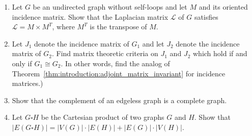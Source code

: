 \begin{enumerate}
\item Let $G$ be an undirected graph without self-loops and let $M$
  and its oriented incidence matrix. Show that the Laplacian matrix
  $\mathcal{L}$ of $G$ satisfies $\mathcal{L} = M \times M^T$, where
  $M^T$ is the transpose of $M$.

\item Let $J_1$ denote the incidence matrix of $G_1$ and let $J_2$
  denote the incidence matrix of $G_2$. Find matrix theoretic criteria
  on $J_1$ and $J_2$ which hold if and only if $G_1 \cong G_2$. In
  other words, find the analog of
  Theorem~\ref{thm:introduction:adjoint_matrix_invariant} for
  incidence matrices.)

\item Show that the complement of an edgeless graph is a complete
  graph.

\item Let $G \square H$ be the Cartesian product of two graphs $G$ and
  $H$. Show that
  $|E(G \square H)| = |V(G)| \cdot |E(H)| + |E(G)| \cdot |V(H)|$.
\end{enumerate}
